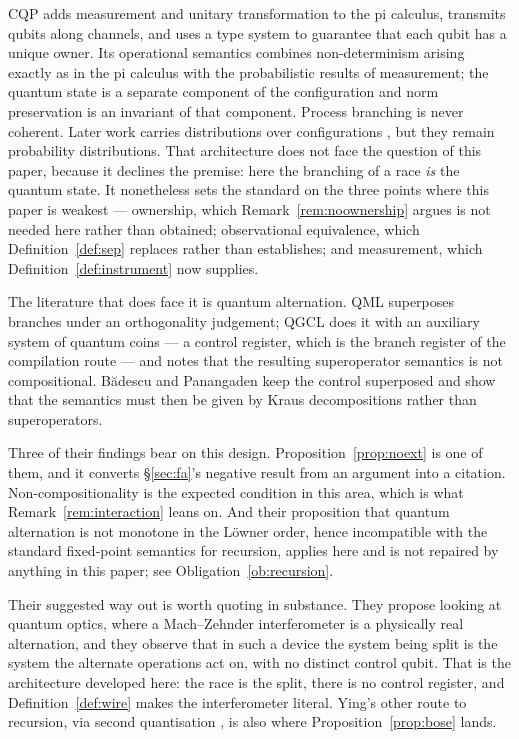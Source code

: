 \documentclass[11pt,a4paper]{article}
\theoremstyle{plain}
\theoremstyle{definition}
\theoremstyle{remark}
\begin{document}
CQP \cite{GayNagarajanCQP,GayNagarajanTypes} adds measurement and unitary
transformation to the pi calculus, transmits qubits along channels, and uses a
type system to guarantee that each qubit has a unique owner. Its operational
semantics combines non-determinism arising exactly as in the pi calculus with
the probabilistic results of measurement; the quantum state is a separate
component of the configuration and norm preservation is an invariant of that
component. Process branching is never coherent. Later work carries distributions
over configurations \cite{QuantumBarbs}, but they remain probability
distributions. That architecture does not face the question of this paper,
because it declines the premise: here the branching of a race \emph{is} the
quantum state. It nonetheless sets the standard on the three points where this
paper is weakest --- ownership, which Remark~\ref{rem:noownership} argues is not
needed here rather than obtained; observational equivalence, which
Definition~\ref{def:sep} replaces rather than establishes; and measurement,
which Definition~\ref{def:instrument} now supplies.

The literature that does face it is quantum alternation. QML
\cite{AltenkirchGrattage} superposes branches under an orthogonality judgement;
QGCL \cite{YingYuFeng} does it with an auxiliary system of quantum coins ---
a control register, which is the branch register of the compilation route ---
and notes that the resulting superoperator semantics is not compositional.
Bădescu and Panangaden \cite{BadescuPanangaden} keep the control superposed and
show that the semantics must then be given by Kraus decompositions rather than
superoperators.

Three of their findings bear on this design. Proposition~\ref{prop:noext} is one
of them, and it converts \S\ref{sec:fa}'s negative result from an argument into
a citation. Non-compositionality is the expected condition in this area, which
is what Remark~\ref{rem:interaction} leans on. And their proposition that
quantum alternation is not monotone in the Löwner order, hence incompatible with
the standard fixed-point semantics for recursion, applies here and is not
repaired by anything in this paper; see Obligation~\ref{ob:recursion}.

Their suggested way out is worth quoting in substance. They propose looking at
quantum optics, where a Mach--Zehnder interferometer is a physically real
alternation, and they observe that in such a device the system being split is
the system the alternate operations act on, with no distinct control qubit. That
is the architecture developed here: the race is the split, there is no control
register, and Definition~\ref{def:wire} makes the interferometer literal. Ying's
other route to recursion, via second quantisation \cite{YingSecondQ}, is also
where Proposition~\ref{prop:bose} lands.
\end{document}
